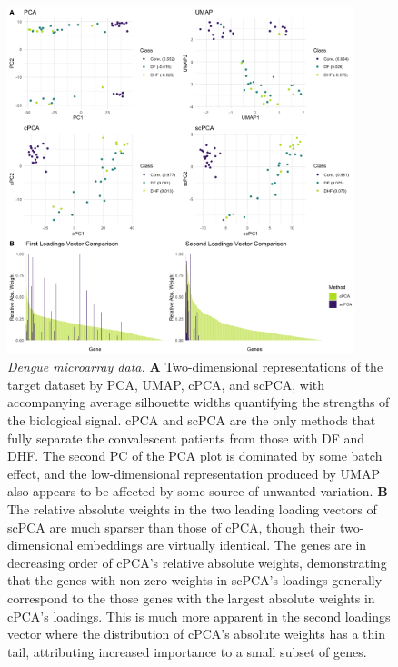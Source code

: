 \begin{figure}[!htbp]
  \centering
  \includegraphics[width = 0.9\textwidth]{figures/dengue_results}
  \caption{
  {\em Dengue microarray data.}
  \textbf{A} Two-dimensional representations of the target dataset by PCA, UMAP, cPCA, and scPCA, with accompanying average silhouette widths quantifying the strengths of the biological signal.  cPCA and scPCA are the only methods that fully separate the convalescent patients from those with DF and DHF. The second PC of the PCA plot is dominated by some batch effect, and the low-dimensional representation produced by UMAP also appears to be affected by some source of unwanted variation. \textbf{B} The relative absolute weights in the two leading loading vectors of scPCA are much sparser than those of cPCA, though their two-dimensional embeddings are virtually identical. The genes are in decreasing order of cPCA's relative absolute weights, demonstrating that the genes with non-zero weights in scPCA's loadings generally correspond to the those genes with the largest absolute weights in cPCA's loadings. This is much more apparent in the second loadings vector where the distribution of cPCA's absolute weights has a thin tail, attributing increased importance to a small subset of genes.}
  \label{fig:dengue}
\end{figure}

